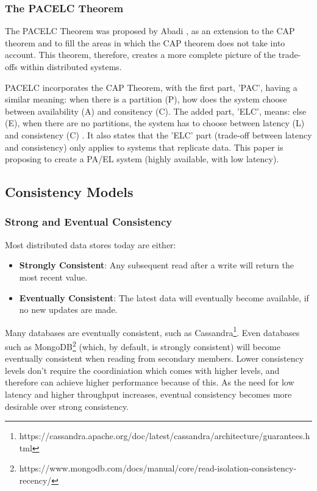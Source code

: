 \documentclass[12pt]{article}
\begin{document}
\subsubsection{The PACELC Theorem}
The PACELC Theorem was proposed by Abadi \cite{6127847}, as an extension to the CAP theorem and to fill the areas in which the CAP theorem does not take into account. This theorem, therefore, creates a more complete picture of the trade-offs within distributed systems. \par
PACELC incorporates the CAP Theorem, with the first part, 'PAC', having a similar meaning: when there is a partition (P), how does the system choose between availability (A) and consitency (C). The added part, 'ELC', means: else (E), when there are no partitions, the system has to choose between latency (L) and consistency (C) \cite{6127847}. It also states that the 'ELC' part (trade-off between latency and consistency) only applies to systems that replicate data. This paper is proposing to create a PA/EL \cite{6127847} system (highly available, with low latency).

\subsection{Consistency Models}
\subsubsection{Strong and Eventual Consistency}
Most distributed data stores today are either:
\begin{itemize}
    \item \textbf{Strongly Consistent}: Any subsequent read after a write will return the most recent value.
    \item \textbf{Eventually Consistent}: The latest data will eventually become available, if no new updates are made.
\end{itemize}
Many databases are eventually consistent, such as Cassandra\footnote{https://cassandra.apache.org/doc/latest/cassandra/architecture/guarantees.html}. Even databases such as MongoDB\footnote{https://www.mongodb.com/docs/manual/core/read-isolation-consistency-recency/} (which, by default, is strongly consistent) will become eventually consistent when reading from secondary members. Lower consistency levels don't require the coordiniation which comes with higher levels, and therefore can achieve higher performance because of this. As the need for low latency and higher throughput increases, eventual consistency becomes more desirable over strong consistency. \par
\end{document}
